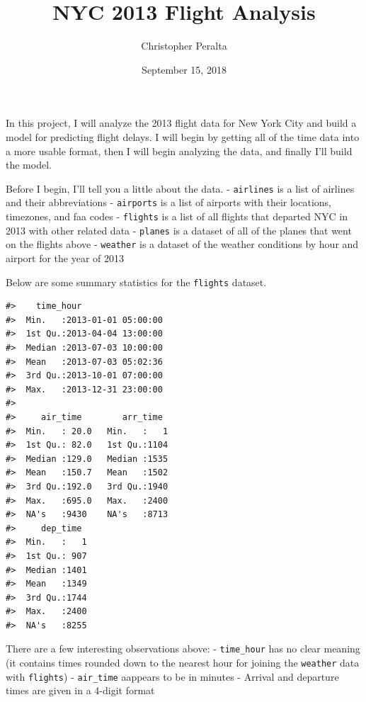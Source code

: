 \documentclass[]{tufte-handout}
\title{NYC 2013 Flight Analysis}
\author{Christopher Peralta}
\date{September 15, 2018}
\begin{document}
\maketitle




In this project, I will analyze the 2013 flight data for New York City
and build a model for predicting flight delays. I will begin by getting
all of the time data into a more usable format, then I will begin
analyzing the data, and finally I'll build the model.

Before I begin, I'll tell you a little about the data. \newline
- \texttt{airlines} is a list of airlines and their abbreviations
\newline
- \texttt{airports} is a list of airports with their locations,
timezones, and faa codes \newline
- \texttt{flights} is a list of all flights that departed NYC in 2013
with other related data \newline
- \texttt{planes} is a dataset of all of the planes that went on the
flights above \newline
- \texttt{weather} is a dataset of the weather conditions by hour and
airport for the year of 2013

Below are some summary statistics for the \texttt{flights} dataset.

\begin{verbatim}
#>    time_hour                  
#>  Min.   :2013-01-01 05:00:00  
#>  1st Qu.:2013-04-04 13:00:00  
#>  Median :2013-07-03 10:00:00  
#>  Mean   :2013-07-03 05:02:36  
#>  3rd Qu.:2013-10-01 07:00:00  
#>  Max.   :2013-12-31 23:00:00  
#>                               
#>     air_time        arr_time   
#>  Min.   : 20.0   Min.   :   1  
#>  1st Qu.: 82.0   1st Qu.:1104  
#>  Median :129.0   Median :1535  
#>  Mean   :150.7   Mean   :1502  
#>  3rd Qu.:192.0   3rd Qu.:1940  
#>  Max.   :695.0   Max.   :2400  
#>  NA's   :9430    NA's   :8713  
#>     dep_time   
#>  Min.   :   1  
#>  1st Qu.: 907  
#>  Median :1401  
#>  Mean   :1349  
#>  3rd Qu.:1744  
#>  Max.   :2400  
#>  NA's   :8255
\end{verbatim}

There are a few interesting observations above: - \texttt{time\_hour}
has no clear meaning (it contains times rounded down to the nearest hour
for joining the \texttt{weather} data with \texttt{flights}) -
\texttt{air\_time} aappears to be in minutes - Arrival and departure
times are given in a 4-digit format
\end{document}
